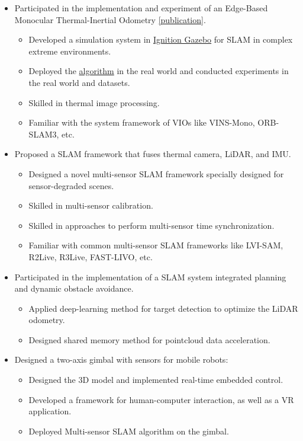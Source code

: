 \documentclass[11pt,a4paper]{moderncv}        %
\begin{document}
%
{
\begin{itemize}%
\item Participated in the implementation and experiment of an Edge-Based Monocular Thermal-Inertial Odometry \hyperref[sec:Publications]{[publication]}.
\begin{itemize}%
\hypersetup{urlcolor=black}
\item Developed a simulation system in \href{https://gazebosim.org/api/gazebo/2.10/index.html}{Ignition Gazebo} for SLAM in complex extreme environments.
\item Deployed the \hyperref[sec:Publications]{algorithm} in the real world and conducted experiments in the real world and datasets.
\item Skilled in thermal image processing.
\item Familiar with the system framework of VIOs like VINS-Mono, ORB-SLAM3, etc.
\end{itemize}
\item Proposed a SLAM framework that fuses thermal camera, LiDAR, and IMU.
\begin{itemize}%
\item Designed a novel multi-sensor SLAM framework specially designed for sensor-degraded scenes. 
\item Skilled in multi-sensor calibration.
\item Skilled in approaches to perform multi-sensor time synchronization.
\item Familiar with common multi-sensor SLAM frameworks like LVI-SAM, R2Live, R3Live, FAST-LIVO, etc.
\end{itemize}
\item Participated in the implementation of a SLAM system integrated planning and dynamic obstacle avoidance.
\begin{itemize}%
\item Applied deep-learning method for target detection to optimize the LiDAR odometry.
\item Designed shared memory method for pointcloud data acceleration.
\end{itemize}
\end{itemize}
}

%
{
\begin{itemize}%
\item Designed a two-axis gimbal with sensors for mobile robots:
\begin{itemize}%
\item Designed the 3D model and implemented real-time embedded control.
\item Developed a framework for human-computer interaction, as well as a VR application.
\item Deployed Multi-sensor SLAM algorithm on the gimbal.  
\end{itemize}
\end{itemize}
}
\end{document}
